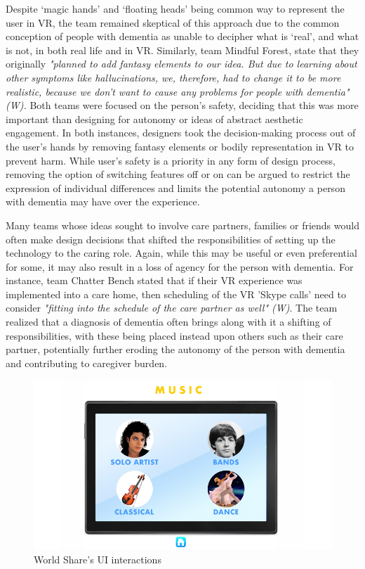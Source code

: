 Despite ‘magic hands’ and ‘floating heads’ being common way to represent the user in VR, the team remained skeptical of this approach due to the common conception of people with dementia as unable to decipher what is ‘real’, and what is not, in both real life and in VR. Similarly, team Mindful Forest, state that they originally \textit{"planned to add fantasy elements to our idea. But due to learning about other symptoms like hallucinations, we, therefore, had to change it to be more realistic, because we don't want to cause any problems for people with dementia" (W).} Both teams were focused on the person’s safety, deciding that this was more important than designing for autonomy or ideas of abstract aesthetic engagement. In both instances, designers took the decision-making process out of the user’s hands by removing fantasy elements or bodily representation in VR to prevent harm. While user’s safety is a priority in any form of design process, removing the option of switching features off or on can be argued to restrict the expression of individual differences and limits the potential autonomy a person with dementia may have over the experience.

Many teams whose ideas sought to involve care partners, families or friends would often make design decisions that shifted the responsibilities of setting up the technology to the caring role. Again, while this may be useful or even preferential for some, it may also result in a loss of agency for the person with dementia. For instance, team Chatter Bench stated that if their VR experience was implemented into a care home, then scheduling of the VR 'Skype calls' need to consider \textit{"fitting into the schedule of the care partner as well" (W)}. The team realized that a diagnosis of dementia often brings along with it a shifting of responsibilities, with these being placed instead upon others such as their care partner, potentially further eroding the autonomy of the person with dementia and contributing to caregiver burden. 

\begin{figure}[htp]
\centering
\includegraphics[width=.8\linewidth]{Images/DemVR/Findings/WorldShareUI.png}
\caption{World Share's UI interactions}
\label{fig:WorldShareUI}
\end{figure}

